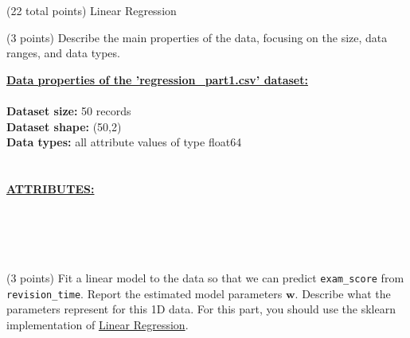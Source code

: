 \documentclass[12pt]{article}
\begin{document}
\begin{question}{(22 total points) Linear Regression}
\begin{subquestion}{(3 points) Describe the main properties of the data, focusing on the size, data ranges, and data types.   
}
\begin{answerbox}{30em}
\large{\textbf{\underline{Data properties of the 'regression\_part1.csv' dataset:}}}\\
\\
\normalsize{
\textbf{Dataset size:} 50 records\\
\textbf{Dataset shape:} (50,2)\\
\textbf{Data types:} all attribute values of type float64\\
\\
\\
\textbf{\underline{ATTRIBUTES:}}}\\
\\
\\
\\
\\
\end{answerbox}



\end{subquestion}




%
%
\begin{subquestion}{(3 points) Fit a linear model to the data so that we can predict \texttt{exam\_score} from \texttt{revision\_time}. 
Report the estimated model parameters $\mathbf{w}$. 
Describe what the parameters represent for this 1D data. 
For this part, you should use the sklearn implementation of \href{https://scikit-learn.org/0.19/modules/generated/sklearn.linear_model.LinearRegression.html}{Linear Regression}.\\
}



\end{subquestion}
\end{question}
\end{document}
